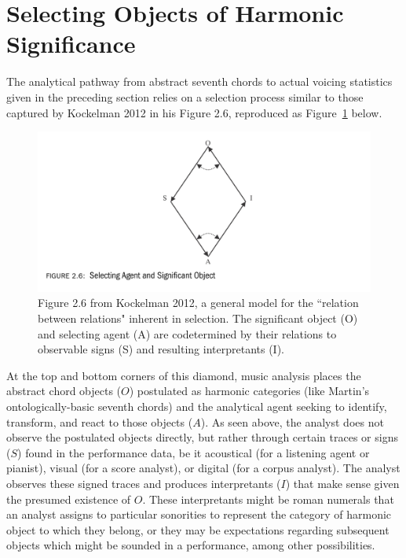 \section{Selecting Objects of Harmonic Significance}

The analytical pathway from abstract seventh chords to actual voicing statistics given in the preceding section relies on a selection process similar to those captured by Kockelman 2012 in his Figure 2.6, reproduced as Figure~\ref{kockelman} below. 

\begin{figure}[h]
	\centering
	\includegraphics[width=6in]{kockelman_model.jpg}
	\caption{Figure 2.6 from Kockelman 2012, a general model for the ``relation between relations" inherent in selection.  The significant object (O) and selecting agent (A) are codetermined by their relations to observable signs (S) and resulting interpretants (I).}
	\label{kockelman}
\end{figure}

At the top and bottom corners of this diamond, music analysis places the abstract chord objects ($O$) postulated as harmonic categories (like Martin's ontologically-basic seventh chords) and the analytical agent seeking to identify, transform, and react to those objects ($A$).  As seen above, the analyst does not observe the postulated objects directly, but rather through certain traces or signs ($S$) found in the performance data, be it acoustical (for a listening agent or pianist), visual (for a score analyst), or digital (for a corpus analyst).  The analyst observes these signed traces and produces interpretants ($I$) that make sense given the presumed existence of $O$.  These interpretants might be roman numerals that an analyst assigns to particular sonorities to represent the category of harmonic object to which they belong, or they may be expectations regarding subsequent objects which might be sounded in a performance, among other possibilities.

